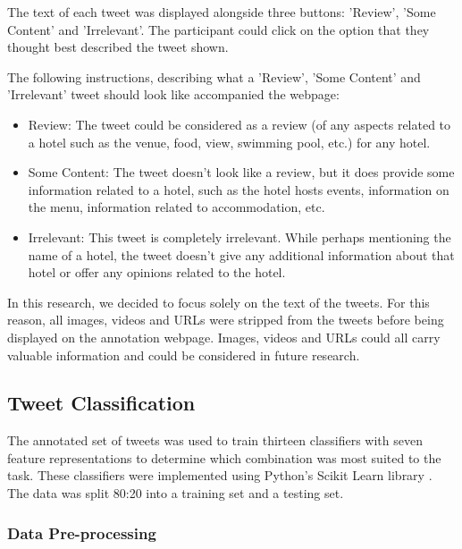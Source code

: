 The text of each tweet was displayed alongside three buttons: 'Review', 'Some Content' and 'Irrelevant'. The participant could click on the option that they thought best described the tweet shown. 

The following instructions, describing what a 'Review', 'Some Content' and 'Irrelevant' tweet should look like accompanied the webpage:
\begin{itemize}
    \item Review: The tweet could be considered as a review (of any aspects related to a hotel such as the venue, food, view, swimming pool, etc.) for any hotel.
    \item Some Content: The tweet doesn't look like a review, but it does provide some information related to a hotel, such as the hotel hosts events, information on the menu, information related to accommodation, etc. 
    \item Irrelevant: This tweet is completely irrelevant. While perhaps mentioning the name of a hotel, the tweet doesn't give any additional information about that hotel or offer any opinions related to the hotel.
\end{itemize}

In this research, we decided to focus solely on the text of the tweets. For this reason, all images, videos and URLs were stripped from the tweets before being displayed on the annotation webpage. Images, videos and URLs could all carry valuable information and could be considered in future research. 

\subsection{Tweet Classification}
The annotated set of tweets was used to train thirteen classifiers with seven feature representations to determine which combination was most suited to the task. These classifiers were implemented using Python's Scikit Learn library \cite{scikit-learn}. The data was split 80:20 into a training set and a testing set.

\subsubsection{Data Pre-processing}

